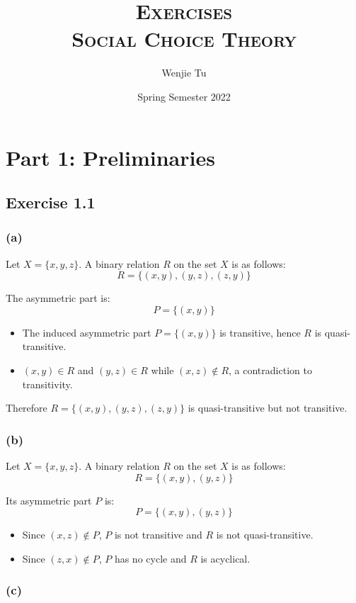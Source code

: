 \documentclass[a4paper]{article}
\title{%
    \textsc{Exercises} \\
    \vspace{1mm}
    \large \textsc{Social Choice Theory}
}
\author{Wenjie Tu}
\date{Spring Semester 2022}
\begin{document}
\maketitle

\section*{Part 1: Preliminaries}

\subsection*{Exercise 1.1}

\subsubsection*{(a)}

Let $X=\{x, y, z\}$. A binary relation $R$ on the set $X$ is as follows:
\[R=\{(x,y), (y,z), (z,y) \} \]

The asymmetric part is:
\[P=\{(x,y)\} \]

\begin{itemize}
    \item The induced asymmetric part $P=\{(x,y)\}$ is transitive, hence $R$ is quasi-transitive.
    \item $(x,y)\in R$ and $(y,z)\in R$ while $(x,z)\notin R$, a contradiction to transitivity.
\end{itemize}

Therefore $R=\{(x,y), (y,z), (z,y) \}$ is quasi-transitive but not transitive.

\subsubsection*{(b)}

Let $X=\{x, y, z\}$. A binary relation $R$ on the set $X$ is as follows:
\[R=\{(x,y), (y,z) \} \]

Its asymmetric part $P$ is:
\[P=\{(x,y), (y,z) \} \]

\begin{itemize}
    \item Since $(x,z)\notin P$, $P$ is not transitive and $R$ is not quasi-transitive.
    \item Since $(z,x)\notin P$, $P$ has no cycle and $R$ is acyclical.
\end{itemize}


\subsubsection*{(c)}
\end{document}

